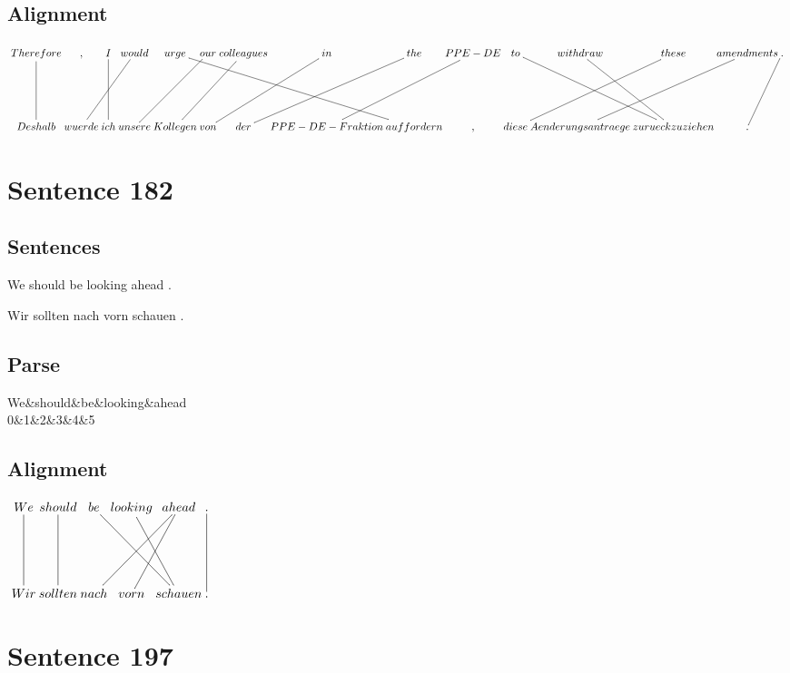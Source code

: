 \documentclass{report}
\begin{document}
\subsection*{Alignment}
\scriptsize{
$
\xymatrix@C-2.3pc{
Therefore \ar @{-} [dd] & , & I \ar @{-} [dd] & would \ar @{-} [ddll] & urge \ar @{-} [ddrrrr] & our \ar @{-} [ddll] & colleagues \ar @{-} [ddll] & in \ar @{-} [ddll] & the \ar @{-} [ddll] & PPE-DE \ar @{-} [ddll] & to \ar @{-} [ddrr] & withdraw \ar @{-} [ddr] & these \ar @{-} [ddll] & amendments \ar @{-} [ddll] & . \ar @{-} [ddl]\\\\
Deshalb & wuerde & ich & unsere & Kollegen & von & der & PPE-DE-Fraktion & auffordern & , & diese & Aenderungsantraege & zurueckzuziehen & .
}$}
\newpage\section*{Sentence 182}

\subsection*{Sentences}
We should be looking ahead .

\noindent Wir sollten nach vorn schauen .



\subsection*{Parse}
\begin{dependency}[theme=simple]
\begin{deptext}[column sep=.5cm, row sep=.1ex]
We\&should\&be\&looking\&ahead\\
0\&1\&2\&3\&4\&5\\
\end{deptext}
\end{dependency}


\subsection*{Alignment}
\scriptsize{
$
\xymatrix@C-2.3pc{
We \ar @{-} [dd] & should \ar @{-} [dd] & be \ar @{-} [ddrr] & looking \ar @{-} [ddr] & ahead \ar @{-} [ddl] \ar @{-} [ddll] & . \ar @{-} [dd]\\\\
Wir & sollten & nach & vorn & schauen & .
}$}
\newpage\section*{Sentence 197}
\end{document}
